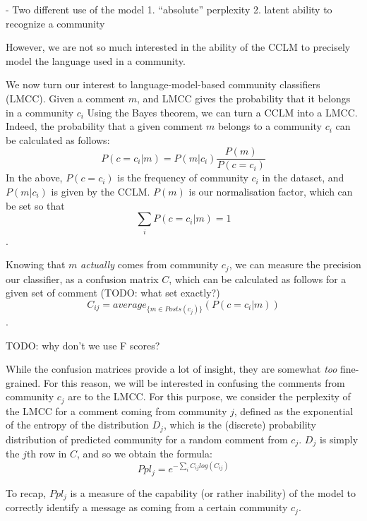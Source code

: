 \documentclass[11pt,a4paper]{article}
\begin{document}
- Two different use of the model
1. ``absolute'' perplexity
2. latent ability to recognize a community


However, we are not so much interested in the ability of the CCLM to
precisely model the language used in a community.

We now turn our interest to language-model-based community classifiers
(LMCC). Given a comment $m$, and LMCC gives the probability that it
belongs in a community $c_i$ Using the Bayes theorem, we can turn a
CCLM into a LMCC. Indeed, the probability that a given comment $m$
belongs to a community $c_i$ can be calculated as follows:
\[P(c=c_i | m) = P(m | c_i)\frac {P(m)} {P(c=c_i)}\]
In the above,
$P(c=c_i)$ is the frequency of community $c_i$ in the dataset, and
$P(m | c_i)$ is given by the CCLM. $P(m)$ is our normalisation factor, which can be set so that
\[\sum_i P(c=c_i | m) = 1\].

Knowing that $m$ \emph{actually} comes from community $c_j$, we can
measure the precision our classifier, as a confusion matrix $C$,
which can be calculated as follows for a given set of comment (TODO: what set exactly?)
\[C_{ij} = average_{\{m ∈ Posts(c_j)\}}(P(c=c_i | m))\].




TODO: why don't we use F scores?

While the confusion matrices provide a lot of insight, they are
somewhat \emph{too} fine-grained. For this reason, we will be
interested in confusing the comments from community $c_j$ are to the
LMCC. For this purpose, we consider the perplexity of the LMCC for a
comment coming from community $j$, defined as the exponential of the
entropy of the distribution \(D_j\), which is the (discrete)
probability distribution of predicted community for a random comment from
$c_j$. $D_j$ is simply the $j$th row in \(C\), and so we obtain the formula:
\[Ppl_j = e^{-\sum_i C_{ij} log(C_{ij})}\]

To recap, \(Ppl_j\) is a measure of the capability (or rather
inability) of the model to correctly identify a message as coming from
a certain community $c_j$. 
\end{document}
